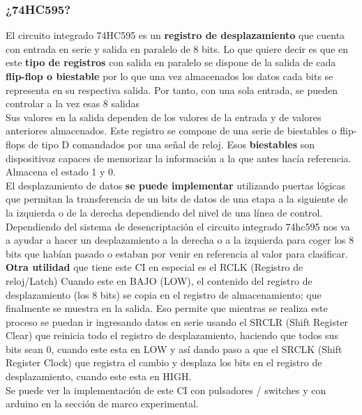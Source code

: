 \documentclass{article}
\begin{document}
\subsubsection*{¿74HC595?}
El circuito integrado 74HC595 es un \textbf{registro de desplazamiento} \cite{74HC595Informacion}  que cuenta con entrada en serie y salida en paralelo de 8 bits. Lo que quiere decir es que en este \textbf{tipo de registros} \cite{tipo_de_registros} con salida en paralelo se dispone de la salida de cada \textbf{flip-flop o biestable} \cite{flip-flop_o_biestable} por lo que una vez almacenados los datos cada bits se representa en su respectiva salida. Por tanto, con una sola entrada, se pueden controlar a la vez esas 8 salidas
\\[0.2cm]
Sus valores en la salida dependen de los valores de la entrada y de valores anteriores almacenados. Este registro se compone de una serie de biestables o flip-flops de tipo D comandados por una señal de reloj. Esos \textbf{biestables} \cite{flip-flop_o_biestable} son dispositivoz capaces de memorizar la información a la que antes hacía referencia. Almacena el estado 1 y 0. 
\\[0.2cm]
El desplazamiento de datos \textbf{se puede implementar} \cite{74hc595_como_funciona} utilizando puertas lógicas que permitan la transferencia de un bits de datos de una etapa a la siguiente de la izquierda o de la derecha dependiendo del nivel de una línea de control.
Dependiendo del sistema de desencriptación el circuito integrado 74hc595 nos va a ayudar a hacer un desplazamiento a la derecha o a la izquierda para coger los 8 bits que habían pasado o estaban por venir en referencia al valor para clasificar.
\\[0.2cm]
\textbf{Otra utilidad} \cite{registro_desplazamiento_almacenamiento} que tiene este CI en especial es el RCLK (Registro de reloj/Latch) Cuando este en BAJO (LOW), el contenido del registro de desplazamiento (los 8 bits) se copia en el registro de almacenamiento; que finalmente se muestra en la salida. Eso permite que mientras se realiza este proceso se puedan ir ingresando datos en serie usando el SRCLR (Shift Register Clear) que reinicia todo el registro de desplazamiento, haciendo que todos sus bits sean 0, cuando este esta en LOW y así dando paso a que el SRCLK (Shift Register Clock) que registra el cambio y desplaza los bits en el registro de desplazamiento, cuando este esta en HIGH.
\\[0.2cm]
Se puede ver la implementación de este CI con pulsadores / switches y con arduino en la sección de marco experimental.
\end{document}
